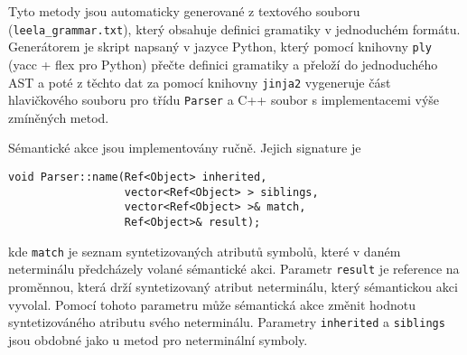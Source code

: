\documentclass[10pt,a4paper]{article}
\begin{document}
Tyto metody jsou automaticky generované z textového souboru
(\verb"leela_grammar.txt"), který obsahuje definici gramatiky v jednoduchém
formátu. Generátorem je skript napsaný v jazyce Python, který pomocí knihovny
\texttt{ply} (yacc + flex pro Python) přečte definici gramatiky a přeloží do
jednoduchého AST a poté z těchto dat za pomocí knihovny \texttt{jinja2}
vygeneruje část hlavičkového souboru pro třídu \texttt{Parser} a C++ soubor s
implementacemi výše zmíněných metod.

Sémantické akce jsou implementovány ručně. Jejich signature je
\begin{lstlisting}
void Parser::name(Ref<Object> inherited,
                  vector<Ref<Object> > siblings, 
                  vector<Ref<Object> >& match,
                  Ref<Object>& result);
\end{lstlisting}
kde \texttt{match} je seznam syntetizovaných atributů symbolů, které v daném
neterminálu předcházely volané sémantické akci. Parametr \texttt{result} je
reference na proměnnou, která drží syntetizovaný atribut neterminálu, který
sémantickou akci vyvolal. Pomocí tohoto parametru může sémantická akce změnit
hodnotu syntetizováného atributu svého neterminálu. Parametry \texttt{inherited}
a \texttt{siblings} jsou obdobné jako u metod pro neterminální symboly.
\end{document}
